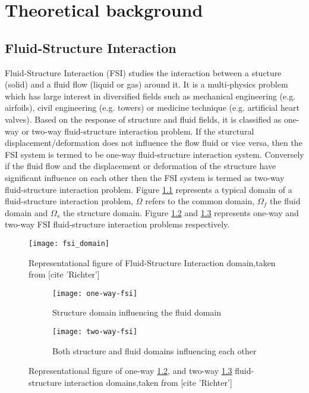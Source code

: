 %
% 

\chapter{Theoretical background}
\label{sec:background}

\section{Fluid-Structure Interaction}
Fluid-Structure Interaction (FSI) studies the interaction between a stucture (solid) and a fluid flow (liquid or gas) around it. It is a multi-physics problem which has large interest in diversified fields such as mechanical engineering (e.g. airfoils), civil engineering (e.g. towers) or medicine technique (e.g. artificial heart valves). Based on the response of structure and fluid fields, it is classified as one-way or two-way fluid-structure interaction problem. If the sturctural displacement/deformation does not influence the flow fluid or vice versa, then the FSI system is termed to be one-way fluid-structure interaction system. Conversely if the fluid flow and the displacement or deformation of the structure have significant influence on each other then the FSI system is termed as two-way fluid-structure interaction problem. Figure \ref{fig:2.1} represents a typical domain of a fluid-structure interaction problem, $\Omega$ refers to the common domain, $ \Omega_{f} $ the fluid domain and $ \Omega_{s} $ the structure domain. Figure   \ref{fig:2.2a} and \ref{fig:2.2b} represents one-way and two-way FSI fluid-structure interaction problems respectively.\\

\begin{figure}[H]
	\centering
	\texttt{[image: fsi\_domain]}
	\caption{Representational figure of Fluid-Structure Interaction domain,taken from [cite 'Richter']}
	\label{fig:2.1}
\end{figure}

\begin{figure}[h]
  \centering
  \captionsetup{justification=centering}
  \begin{subfigure}[b]{0.8\linewidth}
    \texttt{[image: one-way-fsi]}
    \caption{Structure domain influencing the fluid domain}
    \label{fig:2.2a}
  \end{subfigure}
  \begin{subfigure}[b]{0.8\linewidth}
    \texttt{[image: two-way-fsi]}
    \caption{Both structure and fluid domains influencing each other}
    \label{fig:2.2b}
  \end{subfigure}
  \caption{Representational figure of one-way \ref{fig:2.2a}, and two-way \ref{fig:2.2b} fluid-structure interaction domains,taken from [cite 'Richter']}
  \label{fig:2.2}
\end{figure}

